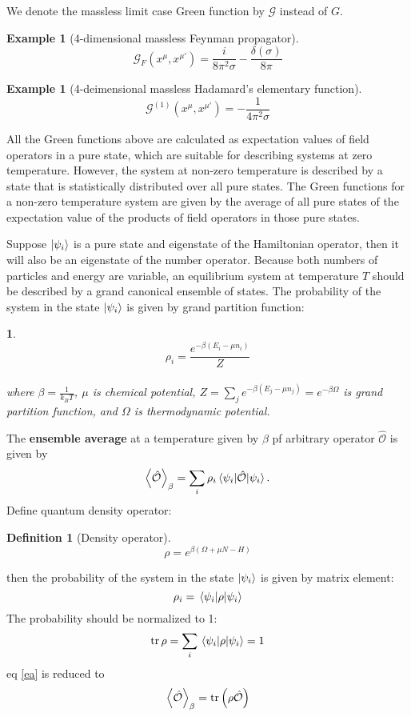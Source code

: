 \documentclass[12pt]{article}
\numberwithin{equation}{section}
\theoremstyle{1style}
\newtheorem{definition}[equation]{Definition}
\newtheorem{example}[equation]{Example}
\newtheorem{cthm}[equation]{}
\newcommand{\tbf}[1]{\textbf{#1}}
\begin{document}
We denote the massless limit case Green function by \(\mathcal{G}\) instead of \(G\).

\begin{example}[4-dimensional massless Feynman propagator]
  \[\mathcal{G}_F(x^{\mu},x^{\mu'})=\frac{i}{8\pi^2\sigma}-\frac{\delta(\sigma)}{8\pi}\]
\end{example}
\begin{example}[4-deimensional massless Hadamard's elementary function]\label{mlhef}
  \[\mathcal{G}^{(1)}(x^{\mu},x^{\mu'})=-\frac{1}{4\pi^2\sigma}\]
\end{example}

All the Green functions above are calculated as expectation values of field operators in a pure state,
which are suitable for describing systems at zero temperature.
However, the system at non-zero temperature is described by a state that is statistically distributed over all pure states.
The Green functions for a non-zero temperature system are given by the average of
all pure states of the expectation value of the products of field operators in those pure states.

Suppose \(\ket{\psi_i}\) is a pure state and eigenstate of the Hamiltonian operator, then it will also be an eigenstate of the number operator.
Because both numbers of particles and energy are variable, an equilibrium system at temperature \(T\) should be described by a grand canonical ensemble of states.
The probability of the system in the state \(\ket{\psi_i}\) is given by grand partition function:
\begin{cthm}
  \[\rho_i=\frac{e^{-\beta (E_i-\mu n_i)}}{Z}\]
  \\
  where \(\beta=\frac{1}{k_BT}\), \(\mu\) is chemical potential, \(Z=\sum_je^{-\beta(E_j-\mu n_j)}=e^{-\beta\Omega}\) is grand partition function,
  and \(\Omega\) is thermodynamic potential.
\end{cthm}
The \tbf{ensemble average} at a temperature given by \(\beta\) pf arbitrary operator \(\mathcal{\hat{O}}\) is given by
\begin{equation}\label{ea}
  \expval{\mathcal{\hat{O}}}_{\beta}=\sum_i\rho_i\expval{\mathcal{\hat{O}}}{\psi_i}.
\end{equation}
Define quantum density operator:
\begin{definition}[Density operator]\label{dOp}
  \[\rho=e^{\beta(\Omega+\mu N-H)}\]
\end{definition}
then the probability of the system in the state \(\ket{\psi_i}\) is given by matrix element:
\begin{equation}
  \rho_i=\expval{\rho}{\psi_i}
\end{equation}
The probability should be normalized to 1:
\begin{equation}
  \tr\rho=\sum_i \expval{\rho}{\psi_i}=1
\end{equation}
eq \ref{ea} is reduced to
\begin{equation}
  \expval{\mathcal{\hat{O}}}_\beta=\tr \left(\rho\mathcal{\hat{O}}\right)
\end{equation}
\end{document}
